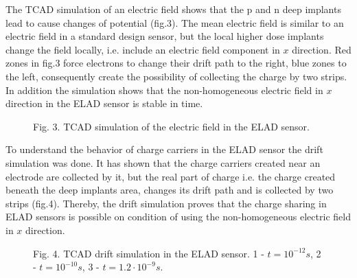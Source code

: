 The TCAD simulation of an electric field shows that the p and n deep implants lead to cause changes of potential (fig.3). The mean electric field is similar to an electric field in a standard design sensor, but the local higher dose implants change the field locally, i.e. include an electric field component in $x$ direction. Red zones in fig.3 force electrons to change their drift path to the right, blue zones to the left, consequently create the possibility of collecting the charge by two strips. In addition the simulation shows that the non-homogeneous electric field in $x$ direction in the ELAD sensor is stable in time. 

\begin{figure}[h]

Fig. 3. TCAD simulation of the electric field in the ELAD sensor. 
\end{figure}

To understand the behavior of charge carriers in the ELAD sensor the drift simulation was done. It has shown that the charge carriers created near an electrode are collected by it, but the real part of charge i.e. the charge created beneath the deep implants area, changes its drift path and is collected by two strips (fig.4).  Thereby, the drift simulation proves that the charge sharing in ELAD sensors is possible on condition of using the non-homogeneous electric field in $x$ direction. 


\begin{figure}[h]

Fig. 4. TCAD drift simulation in the ELAD sensor. 1 - $t = 10^{-12} s$, 2 - $t = 10^{-10} s$, 3 - $t = 1.2 \cdot 10^{-9} s$. 
\end{figure}

